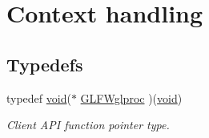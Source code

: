 \hypertarget{group__context}{\section{Context handling}
\label{group__context}
}
\subsection*{Typedefs}
\begin{DoxyCompactItemize}
\item 
typedef \hyperlink{wglew_8h_aeea6e3dfae3acf232096f57d2d57f084}{void}($\ast$ \hyperlink{group__context_gabf42b10edde1c4fc71e212e576b9f811}{G\-L\-F\-Wglproc} )(\hyperlink{wglew_8h_aeea6e3dfae3acf232096f57d2d57f084}{void})
\begin{DoxyCompactList}\small\item\em Client A\-P\-I function pointer type. \end{DoxyCompactList}\end{DoxyCompactItemize}
